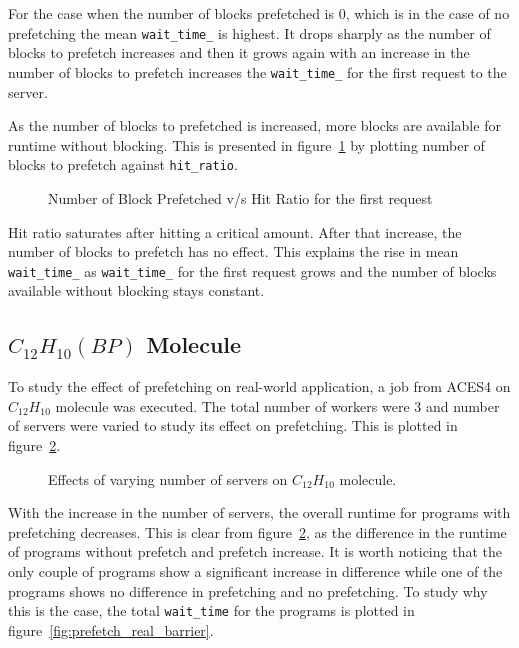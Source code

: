 For the case when the number of blocks prefetched is 0, which is in the case of no
prefetching the mean \texttt{wait\_time\_} is highest. It drops sharply as the
number of blocks to prefetch increases and then it grows again with an increase in the number
of blocks to prefetch increases the \texttt{wait\_time\_} for the first request to
the server.

As the number of blocks to prefetched is increased, more blocks are available for
runtime without blocking. This is presented in figure~\ref{fig:look_ahead_hit_ratio}
by plotting number of blocks to prefetch against \texttt{hit\_ratio}.

\begin{figure}[h]
  
  \caption{Number of Block Prefetched v/s Hit Ratio for the first request}
  \label{fig:look_ahead_hit_ratio}
\end{figure}

Hit ratio saturates after hitting a critical amount. After that increase, the number
of blocks to prefetch has no effect. This explains the rise in mean
\texttt{wait\_time\_} as \texttt{wait\_time\_} for the first request grows and the
number of blocks available without blocking stays constant.

\subsection{$C_{12}H_{10}(BP)$ Molecule}\label{sec:bp_molecule}
To study the effect of prefetching on real-world application, a job from ACES4 on
$C_{12}H_{10}$ molecule was executed. The total number of workers were 3 and number
of servers were varied to study its effect on prefetching. This is plotted in
figure~\ref{fig:prefetch_real}.

\begin{figure}[h]
  
  \caption{Effects of varying number of servers on $C_{12}H_{10}$ molecule.}
  \label{fig:prefetch_real}
\end{figure}

With the increase in the number of servers, the overall runtime for programs with
prefetching decreases. This is clear from figure~\ref{fig:prefetch_real}, as the difference
in the runtime of programs without prefetch and prefetch increase. It is worth noticing
that the only couple of programs show a significant increase in difference while one
of the programs shows no difference in prefetching and no prefetching. To study
why this is the case, the total \texttt{wait\_time} for the programs is plotted in
figure~\ref{fig:prefetch_real_barrier}.

